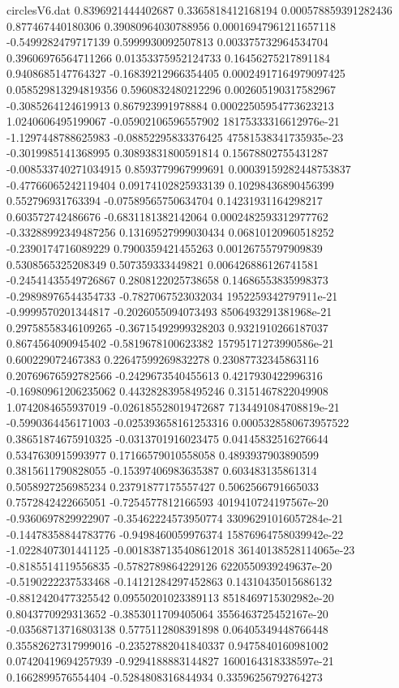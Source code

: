 \begin{filecontents}{circlesV6.dat}
0.8396921444402687	0.3365818412168194	0.000578859391282436
0.877467440180306	0.39080964030788956	0.00016947961211657118
-0.5499282479717139	0.5999930092507813	0.003375732964534704
0.39606976564711266	0.01353375952124733	0.16456275217891184
0.9408685147764327	-0.16839212966354405	0.00024917164979097425
0.058529813294819356	0.5960832480212296	0.002605190317582967
-0.3085264124619913	0.867923991978884	0.00022505954773623213
1.0240606495199067	-0.05902106596557902	18175333316612976e-21
-1.1297448788625983	-0.08852295833376425	47581538341735935e-23
-0.3019985141368995	0.30893831800591814	0.15678802755431287
-0.008533740271034915	0.8593779967999691	0.00039159282448753837
-0.47766065242119404	0.09174102825933139	0.10298436890456399
0.552796931763394	-0.07589565750634704	0.14231931164298217
0.603572742486676	-0.6831181382142064	0.0002482593312977762
-0.33288992349487256	0.13169527999030434	0.06810120960518252
-0.2390174716089229	0.7900359421455263	0.00126755797909839
0.5308565325208349	0.507359333449821	0.006426886126741581
-0.24541435549726867	0.2808122025738658	0.14686553835998373
-0.29898976544354733	-0.7827067523032034	1952259342797911e-21
-0.9999570201344817	-0.2026055094073493	8506493291381968e-21
0.29758558346109265	-0.36715492999328203	0.9321910266187037
0.8674564090945402	-0.5819678100623382	15795171273990586e-21
0.600229072467383	0.22647599269832278	0.23087732345863116
0.20769676592782566	-0.2429673540455613	0.4217930422996316
-0.16980961206235062	0.44328283958495246	0.3151467822049908
1.0742084655937019	-0.026185528019472687	7134491084708819e-21
-0.5990364456171003	-0.025393658161253316	0.0005328580673957522
0.38651874675910325	-0.0313701916023475	0.04145832516276644
0.5347630915993977	0.17166579010558058	0.4893937903890599
0.3815611790828055	-0.15397406983635387	0.603483135861314
0.5058927256985234	0.23791877175557427	0.5062566791665033
0.7572842422665051	-0.7254577812166593	4019410724197567e-20
-0.9360697829922907	-0.35462224573950774	33096291016057284e-21
-0.14478358844783776	-0.9498460059976374	15876964758039942e-22
-1.0228407301441125	-0.0018387135408612018	36140138528114065e-23
-0.8185514119556835	-0.5782789864229126	6220550939249637e-20
-0.5190222237533468	-0.14121284297452863	0.14310435015686132
-0.8812420477325542	0.09550201023389113	8518469715302982e-20
0.8043770929313652	-0.3853011709405064	3556463725452167e-20
-0.03568713716803138	0.5775112808391898	0.06405349448766448
0.35582627317999016	-0.23527882041840337	0.9475840160981002
0.07420419694257939	-0.9294188883144827	1600164318338597e-21
0.1662899576554404	-0.5284808316844934	0.33596256792764273

\end{filecontents}
